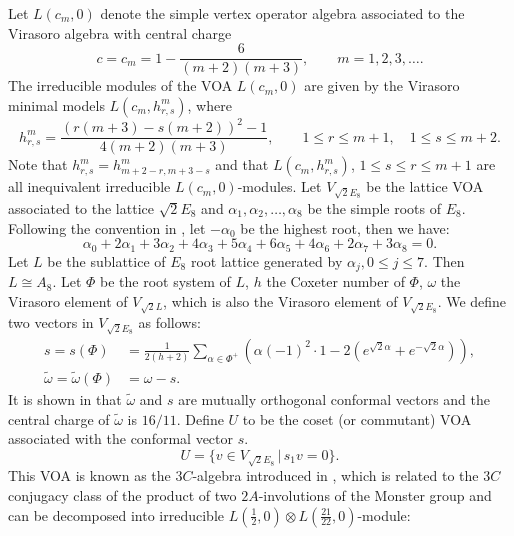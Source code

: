 \documentclass{article}
\begin{document}
	
	Let $L(c_m, 0)$ denote the simple vertex operator algebra associated to the Virasoro algebra with central charge
	\begin{equation}\label{eq:VIRC}
		c=c_m=1-\frac{6}{(m+2)(m+3)}, \qquad m=1,2,3, \dots.
	\end{equation}
	The irreducible modules of the VOA $L(c_m,0)$ are given by the Virasoro minimal models $L(c_m,h^m_{r,s})$, where
	\begin{equation}\label{eq:VIRH}
		h^m_{r,s} = \frac{(r(m+3)-s(m+2))^2 - 1}{4(m+2)(m+3)},\qquad 1 \le
		r \le m+1,\quad 1 \le s \le m+2.
	\end{equation}
	Note that $h^m_{r,s} = h^m_{m+2-r,m+3-s}$ and that
	$L(c_m,h^m_{r,s})$, $1 \le s \le r \le m+1$ are all
	inequivalent irreducible $L(c_m,0)$-modules.
	Let  $V_{\sqrt{2}E_8}$ be the lattice VOA associated to the lattice $\sqrt{2}E_8$ and $\alpha_1,\alpha_2,\dots,\alpha_8$ be the simple roots of $E_8$. Following the convention in \cite{LYY}, let $-\alpha_0$ be the highest root, then we have:
	\begin{equation}\label{eq:A_0}
		\alpha_0+2\alpha_1+3\alpha_2+4\alpha_3+ 5\alpha_4+6\alpha_5+4\alpha_6+2\alpha_7+3\alpha_8 =
		0.
	\end{equation}
	Let $L$ be the sublattice of $E_8$ root lattice generated by
	$\alpha_j, 0 \le j \le 7$. Then $L\cong A_8$. Let $\Phi$ be the root system of $L$, $h$ the Coxeter number of $\Phi$, $\omega$ the Virasoro element of $V_{\sqrt{2}L}$, which is also the Virasoro element of $V_{\sqrt{2}E_8}$. We define two vectors in $V_{\sqrt{2}E_8}$ as follows:
	\begin{equation}\label{sw}
		\begin{split}
			s=s(\Phi)&=\frac{1}{2(h+2)}\sum_{\alpha\in \Phi^+}\left(
			\alpha(-1)^2\cdot
			1 -2(e^{\sqrt{2}\alpha}+ e^{-\sqrt{2}\alpha})\right),\\
			\tilde{\omega}=\tilde{\omega}(\Phi)&= \omega - s.
		\end{split}
	\end{equation}
	It is shown in \cite{DLMN} that $\tilde{\omega}$ and $s$ are mutually
	orthogonal conformal vectors and the central charge of
	$\tilde{\omega}$ is $16/11$.  Define $U$ to be the coset (or commutant) VOA associated with the conformal vector $s$.
	\begin{equation}\label{3c}
		U=\{v\in V_{\sqrt{2}E_8}\,| \, s_1 v=0 \}.
	\end{equation}
	This VOA is known as the $3C$-algebra introduced in \cite{LYY},  which is related to the $3C$ conjugacy class of the product of two $2A$-involutions of the Monster group \cite{C}  and can be decomposed into irreducible $L(\frac{1}2,0)\otimes L(\frac{21}{22},0)$-module:
\end{document}
